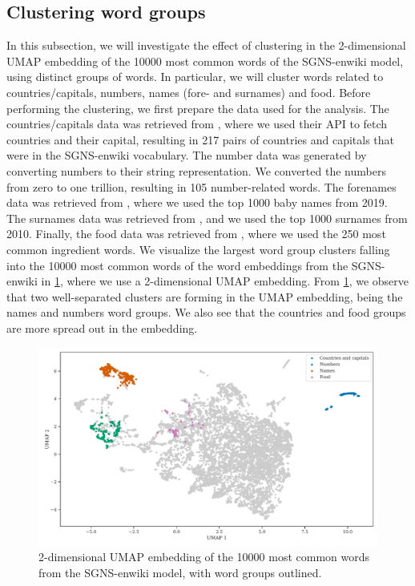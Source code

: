 \subsection{Clustering word groups}
\label{sec:clustering-word-groups}
In this subsection, we will investigate the effect of clustering in the 2-dimensional UMAP embedding of the 10000 most common words of the SGNS-enwiki model, using distinct groups of words. In particular, we will cluster words related to countries/capitals, numbers, names (fore- and surnames) and food. Before performing the clustering, we first prepare the data used for the analysis. The countries/capitals data was retrieved from \cite{GeoNames}, where we used their API to fetch countries and their capital, resulting in 217 pairs of countries and capitals that were in the SGNS-enwiki vocabulary. The number data was generated by converting numbers to their string representation. We converted the numbers from zero to one trillion, resulting in 105 number-related words. The forenames data was retrieved from \cite{SSABabyNames}, where we used the top 1000 baby names from 2019. The surnames data was retrieved from \cite{CensusSurnames}, and we used the top 1000 surnames from 2010. Finally, the food data was retrieved from \cite{FoodIngredientList}, where we used the 250 most common ingredient words. We visualize the largest word group clusters falling into the 10000 most common words of the word embeddings from the SGNS-enwiki in \cref{fig:word-cluster-all-groups}, where we use a 2-dimensional UMAP embedding. From \cref{fig:word-cluster-all-groups}, we observe that two well-separated clusters are forming in the UMAP embedding, being the names and numbers word groups. We also see that the countries and food groups are more spread out in the embedding.
\begin{figure}[H]
    \centering
    \includegraphics[width=\textwidth]{thesis/figures/word-cluster-all-groups.pdf}
    \caption{2-dimensional UMAP embedding of the 10000 most common words from the SGNS-enwiki model, with word groups outlined.}
    \label{fig:word-cluster-all-groups}
\end{figure}

